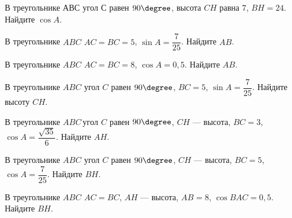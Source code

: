 \begin{class}[number=11]
\begin{listofex}
		\item В треугольнике \( АВС \) угол \( С \) равен \( 90\degree \), высота \( CH \) равна \( 7 \), \( BH = 24 \). Найдите  \( \cos A \).
		\item В треугольнике \( ABC \) \( AC=BC=5\),  \( \sin A = \dfrac{7}{25} \).  Найдите \(AB\).
		\item В треугольнике \( ABC \) \( AC = BC = 8 \),  \( \cos A = 0,5 \). Найдите \(AB\).
		\item В треугольнике \( ABC \) угол \( C \) равен \( 90\degree \), \( BC=5 \), \( \sin A=\dfrac{7}{25} \).  Найдите высоту \( CH \).
		\item В треугольнике \( ABC \) угол \( C \) равен \( 90\degree \), \( CH \) --- высота, \( BC=3 \), \( \cos A=\dfrac{\sqrt{35}}{6} \).  Найдите \( AH \).
		\item В треугольнике \( ABC \) угол \( C \) равен \( 90\degree \), \( CH \) --- высота, \( BC=5 \),  \( \cos A=\dfrac{7}{25} \).  Найдите \( BH \).
		\item В треугольнике \( ABC \) \( AC = BC \), \( AH \) --- высота, \( AB = 8 \),  \( \cos BAC = 0,5 \). Найдите \( BH \).
	\end{listofex}
\end{class}

